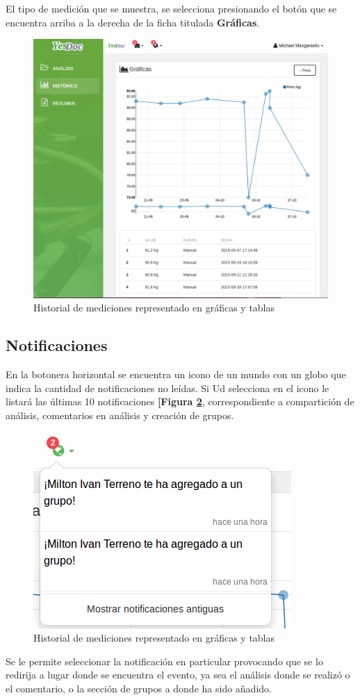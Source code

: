El tipo de medición que se muestra, se selecciona presionando el botón que se encuentra arriba a la derecha de la ficha titulada \textbf{Gráficas}.

\begin{figure}
	\centering
	\includegraphics[width=.8\textwidth]{img/manual_de_usuario/historico}
	\caption{Historial de mediciones representado en gráficas y tablas}
	\label{mu-historico}
\end{figure}

\subsection{Notificaciones}
En la botonera horizontal se encuentra un icono de un mundo con un globo que indica la cantidad de notificaciones no leídas. Si Ud selecciona en el icono le listará las últimas 10 notificaciones \textbf{[Figura \ref{mu-notificaciones_vista_previa}}, correspondiente a compartición de análisis, comentarios en análisis y creación de grupos. 
\begin{figure}
	\centering
	\includegraphics[width=.8\textwidth]{img/manual_de_usuario/notificaciones_vista_previa}
	\caption{Historial de mediciones representado en gráficas y tablas}
	\label{mu-notificaciones_vista_previa}
\end{figure}
Se le permite seleccionar la notificación en particular provocando que se lo redirija a lugar donde se encuentra el evento, ya sea el análisis donde se realizó o el comentario, o la sección de grupos a donde ha sido añadido.

